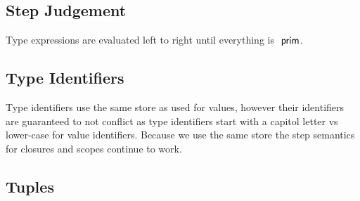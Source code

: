 \documentclass{article}
\begin{document}
\subsection{Step Judgement}
Type expressions are evaluated left to right until everything is $~\mathsf{prim}$.
{
    \centering
    \def \MathparLineskip {\lineskip=0.43cm}
}

\subsection{Type Identifiers}
Type identifiers use the same store as used for values, however their identifiers are guaranteed to not conflict as type identifiers start with a capitol letter vs lower-case for value identifiers. Because we use the same store the step semantics for closures and scopes continue to work.
{
    \centering
    \def \MathparLineskip{\lineskip=0.43cm}
}

\subsection{Tuples}
{
    \centering
    \def \MathparLineskip{\lineskip=0.43cm}
}
\end{document}
